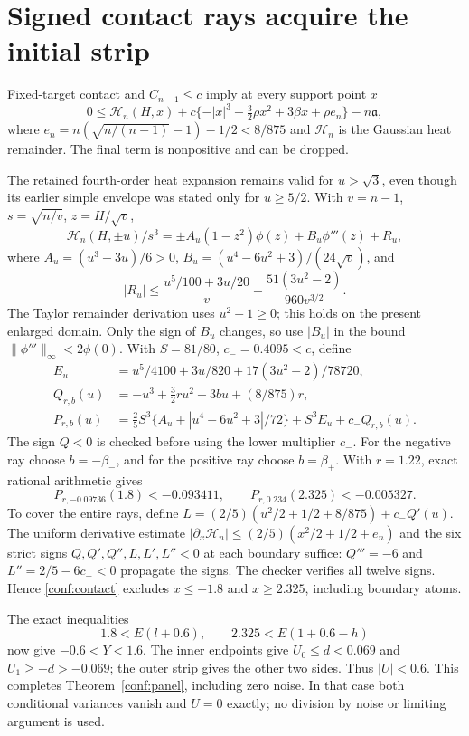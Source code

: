 \documentclass[11pt]{article}
\begin{document}
\section{Signed contact rays acquire the initial strip}
Fixed-target contact and $C_{n-1}\le c$ imply at every support point $x$
\begin{equation}\label{conf:contact}
 0\le\mathcal H_n(H,x)+c\{-|x|^3+\tfrac32\rho x^2+3\beta x+\rho e_n\}
                         -n\mathfrak a,
\end{equation}
where $e_n=n(\sqrt{n/(n-1)}-1)-1/2<8/875$ and $\mathcal H_n$ is the
Gaussian heat remainder. The final term is nonpositive and can be dropped.

The retained fourth-order heat expansion remains valid for $u>\sqrt3$,
even though its earlier simple envelope was stated only for $u\ge5/2$.
With $v=n-1$, $s=\sqrt{n/v}$, $z=H/\sqrt v$,
\[
 \mathcal H_n(H,\pm u)/s^3
 =\pm A_u(1-z^2)\phi(z)+B_u\phi'''(z)+R_u,
\]
where $A_u=(u^3-3u)/6>0$,
$B_u=(u^4-6u^2+3)/(24\sqrt v)$, and
\[
 |R_u|\le\frac{u^5/100+3u/20}{v}
                +\frac{51(3u^2-2)}{960v^{3/2}}.
\]
The Taylor remainder derivation uses $u^2-1\ge0$; this holds on the
present enlarged domain. Only the sign of $B_u$ changes, so use
$|B_u|$ in the bound $\|\phi'''\|_\infty<2\phi(0)$.
With $S=81/80$, $c_-=0.4095<c$, define
\begin{align*}
 E_u&=u^5/4100+3u/820+17(3u^2-2)/78720,\\
 Q_{r,b}(u)&=-u^3+\tfrac32ru^2+3bu+(8/875)r,\\
 P_{r,b}(u)&=\tfrac25S^3\{A_u+|u^4-6u^2+3|/72\}
                                  +S^3E_u+c_-Q_{r,b}(u).
\end{align*}
The sign $Q<0$ is checked before using the lower multiplier $c_-$.
For the negative ray choose $b=-\beta_-$, and for the positive ray
choose $b=\beta_+$. With $r=1.22$, exact rational arithmetic gives
\[
 P_{r,-0.09736}(1.8)<-0.093411,
 \qquad P_{r,0.234}(2.325)<-0.005327.
\]
To cover the entire rays, define
$L=(2/5)(u^2/2+1/2+8/875)+c_-Q'(u)$.
The uniform derivative estimate
$|\partial_x\mathcal H_n|\le(2/5)(x^2/2+1/2+e_n)$
and the six strict signs $Q,Q',Q'',L,L',L''<0$ at each boundary suffice:
$Q'''=-6$ and $L''=2/5-6c_-<0$ propagate the signs.
The checker verifies all twelve signs. Hence \eqref{conf:contact}
excludes $x\le-1.8$ and $x\ge2.325$, including boundary atoms.

The exact inequalities
\[
 1.8<E(l+0.6),\qquad 2.325<E(1+0.6-h)
\]
now give $-0.6<Y<1.6$. The inner endpoints give $U_0\le d<0.069$
and $U_1\ge-d>-0.069$; the outer strip gives the other two sides.
Thus $|U|<0.6$. This completes Theorem~\ref{conf:panel}, including zero
noise. In that case both conditional variances vanish and $U=0$ exactly;
no division by noise or limiting argument is used.
\end{document}
